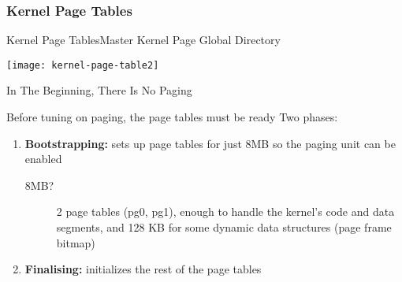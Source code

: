 \subsubsection{Kernel Page Tables}

\begin{frame}{Kernel Page Tables}{Master Kernel Page Global Directory}
  \begin{center}
    \texttt{[image: kernel-page-table2]}
  \end{center}
\end{frame}

\begin{frame}{In The Beginning, There Is No Paging}
  \begin{block}{Before tuning on paging, the page tables must be ready}
    Two phases:
    \begin{enumerate}
    \item \textbf{Bootstrapping:} sets up page tables for just 8MB so the paging unit can
      be enabled
      \begin{description}
      \item[8MB?] 2 page tables (pg0, pg1), enough to handle the kernel's code and data
        segments, and 128 KB for some dynamic data structures (page frame bitmap)
      \end{description}
    \item \textbf{Finalising:} initializes the rest of the page tables
    \end{enumerate}
  \end{block}  
\end{frame}

